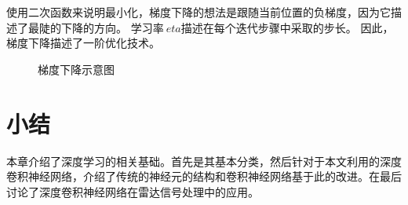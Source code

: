 使用二次函数来说明最小化，梯度下降的想法是跟随当前位置的负梯度，因为它描述了最陡的下降的方向。 学习率$ \ eta $描述在每个迭代步骤中采取的步长。 因此，梯度下降描述了一阶优化技术。

\begin{figure}[hbt]
	\centering
	\caption{梯度下降示意图}
	\label{fig:gradient-descent}
\end{figure}

\section{小结}
本章介绍了深度学习的相关基础。首先是其基本分类，然后针对于本文利用的深度卷积神经网络，介绍了传统的神经元的结构和卷积神经网络基于此的改进。在最后讨论了深度卷积神经网络在雷达信号处理中的应用。

